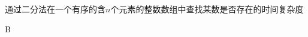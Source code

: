 \documentclass{myMacExam}
\begin{document}


\begin{problems}
\qu 通过二分法在一个有序的含$n$个元素的整数数组中查找某数是否存在的时间复杂度是\t
{}
\begin{solution}
	B
\end{solution}
 
 
\end{problems}  


 
\end{document}
